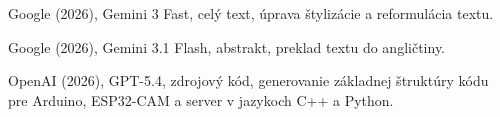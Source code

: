 \begin{trivlist}
\item Google (2026), Gemini 3 Fast, celý text, úprava štylizácie a reformulácia textu.

\item Google (2026), Gemini 3.1 Flash, abstrakt, preklad textu do angličtiny. 

\item OpenAI (2026), GPT-5.4, zdrojový kód, generovanie základnej štruktúry kódu pre Arduino, ESP32-CAM a server v jazykoch C++ a Python.
\end{trivlist}
